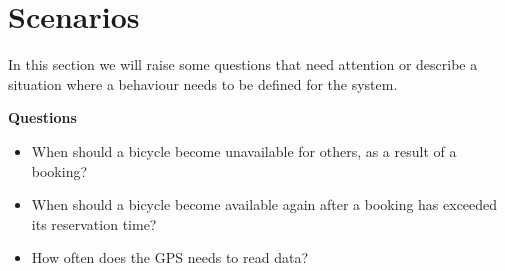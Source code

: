 \section{Scenarios}\label{sec:behaviourProblems}
In this section we will raise some questions that need attention or describe a situation where a behaviour needs to be defined for the system.

\textbf{Questions}
\begin{itemize}
\item When should a bicycle become unavailable for others, as a result of a booking?
\item When should a bicycle become available again after a booking has exceeded its reservation time?
\item How often does the GPS needs to read data?
\end{itemize}

